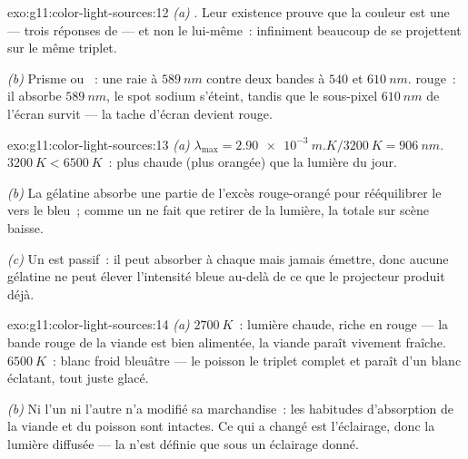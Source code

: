 \begin{solution}{exo:g11:color-light-sources:12}
\emph{(a)} . Leur existence prouve
que la couleur est une  --- trois
réponses de  --- et non le
 lui-même~: infiniment beaucoup de 
se projettent sur le même triplet.

\emph{(b)} Prisme ou ~: une raie à
$\qty{589}{nm}$ contre deux bandes à $540$ et $\qty{610}{nm}$.
 rouge~: il absorbe
$\qty{589}{nm}$, le spot sodium s'éteint, tandis que le sous-pixel
$\qty{610}{nm}$ de l'écran survit --- la tache d'écran devient rouge.
\end{solution}

\begin{solution}{exo:g11:color-light-sources:13}
\emph{(a)} $\lambda_{\max} = \qty{2.90e-3}{m.K}/\qty{3200}{K} =
\qty{906}{nm}$. 
$\qty{3200}{K} < \qty{6500}{K}$~: plus chaude (plus orangée) que la
lumière du jour.

\emph{(b)} La gélatine absorbe une partie de l'excès rouge-orangé pour
rééquilibrer le  vers le bleu~; comme un
 ne fait que retirer de la lumière,
la  totale sur scène baisse.

\emph{(c)} Un  est passif~: il peut
absorber à chaque  mais jamais
émettre, donc aucune gélatine ne peut élever l'intensité bleue au-delà
de ce que le projecteur produit déjà.
\end{solution}

\begin{solution}{exo:g11:color-light-sources:14}
\emph{(a)} $\qty{2700}{K}$~: lumière chaude, riche en rouge --- la
bande rouge de la viande est bien alimentée, la viande paraît
vivement fraîche. $\qty{6500}{K}$~: blanc froid bleuâtre --- le
poisson  le triplet complet et
paraît d'un blanc éclatant, tout juste glacé.

\emph{(b)} Ni l'un ni l'autre n'a modifié sa marchandise~: les
habitudes d'absorption de la viande et du poisson sont intactes. Ce
qui a changé est l'éclairage, donc la lumière diffusée --- la
 n'est définie que sous
un éclairage donné.
\end{solution}

